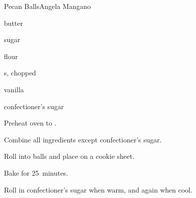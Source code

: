 \begin{recipe}{Pecan Balls}{Angela Mangano}{}

\begin{ingredients}
\item \lbs{\half} butter
\item {} sugar
\item {} flour
\item {} s, chopped
\item {} vanilla
\item confectioner's sugar
\end{ingredients}

\begin{directions}
\item Preheat oven to .
\item Combine all ingredients except confectioner's sugar.
\item Roll into balls and place on a cookie sheet.
\item Bake for 25~minutes.
\item Roll in confectioner's sugar when warm, and again when cool.
\end{directions}

\end{recipe}
